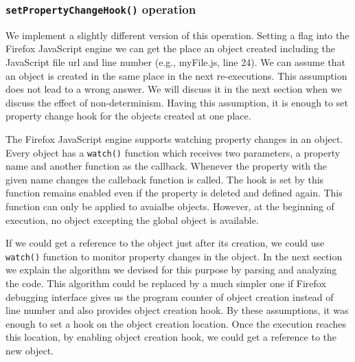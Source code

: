 \documentclass[preprint]{sigplanconf}
\begin{document}
\subsubsection{\texttt{setPropertyChangeHook()} operation}
We implement a slightly different version of this operation. Setting a flag into the Firefox JavaScript engine we can get the place an object created including the JavaScript file url and line number (e.g., myFile.js, line 24). We can assume that an object is created in the same place in the next re-executions. This assumption does not lead to a wrong answer. We will discuss it in the next section when we discuss the effect of non-determinism. Having this assumption, it is enough to set property change hook for the objects created at one place. 

The Firefox JavaScript engine supports watching property changes in an object. Every object has a \texttt{watch()} function which receives two parameters, a property name and another function as the callback. Whenever the property with the given name changes the calleback function is called. The hook is set by this function remains enabled even if the property is deleted and defined again. This function can only be applied to avaialbe objects. However, at the beginning of execution, no object excepting the global object is available. 

If we could get a reference to the object just after its creation, we could use \texttt{watch()} function to monitor property changes in the object. In the next section we explain the algorithm we devised for this purpose by parsing and analyzing the code. This algorithm could be replaced by a much simpler one if Firefox debugging interface gives us the program counter of object creation instead of line number and also provides object creation hook.
By these assumptions, it was enough to set a hook on the object creation location. Once the execution reaches this location, by enabling object creation hook, we could get a reference to the new object. 

 
\end{document}

